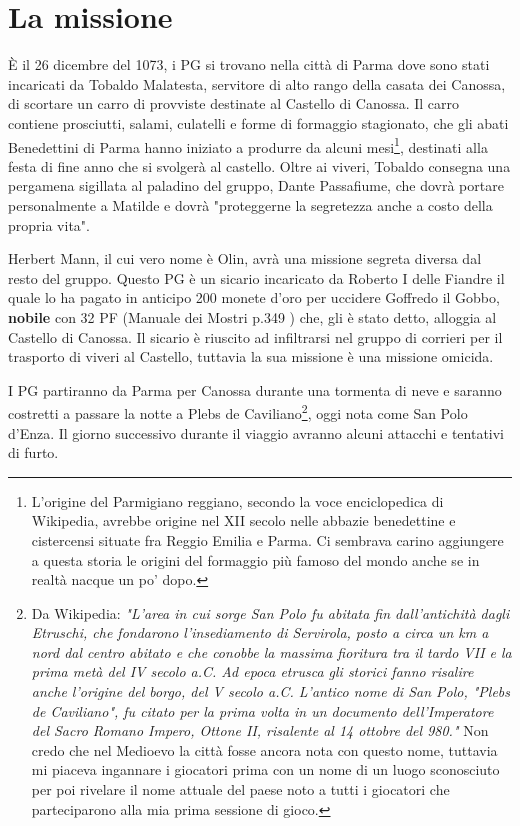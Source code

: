 \documentclass[letterpaper,twocolumn,openany,nodeprecatedcode]{dndbook}
\begin{document}
\section{La missione}
È il 26 dicembre del 1073, i PG si trovano nella città di Parma dove sono stati incaricati da Tobaldo Malatesta, servitore di alto rango della casata dei Canossa, di scortare un carro di provviste destinate al Castello di Canossa. Il carro contiene prosciutti, salami, culatelli e forme di formaggio stagionato, che gli abati Benedettini di Parma hanno iniziato a produrre da alcuni mesi\footnote{L'origine del Parmigiano reggiano, secondo la voce enciclopedica di Wikipedia, avrebbe origine nel XII secolo nelle abbazie benedettine e cistercensi situate fra Reggio Emilia e Parma. Ci sembrava carino aggiungere a questa storia le origini del formaggio più famoso del mondo anche se in realtà nacque un po' dopo.}, destinati alla festa di fine anno che si svolgerà al castello. Oltre ai viveri, Tobaldo consegna una pergamena sigillata al paladino del gruppo, Dante Passafiume, che dovrà portare personalmente a Matilde e dovrà "proteggerne la segretezza anche a costo della propria vita".

Herbert Mann, il cui vero nome è Olin, avrà una missione segreta diversa dal resto del gruppo. Questo PG è un sicario incaricato da Roberto I delle Fiandre il quale lo ha pagato in anticipo 200 monete d'oro per uccidere Goffredo il Gobbo, \textbf{nobile} con 32 PF (Manuale dei Mostri p.349 \cite{dnd:mostri}) che, gli è stato detto, alloggia al Castello di Canossa. Il sicario è riuscito ad infiltrarsi nel gruppo di corrieri per il trasporto di viveri al Castello, tuttavia la sua missione è una missione omicida.

I PG partiranno da Parma per Canossa durante una tormenta di neve e saranno costretti a passare la notte a Plebs de Caviliano\footnote{Da Wikipedia: \textit{"L'area in cui sorge San Polo fu abitata fin dall'antichità dagli Etruschi, che fondarono l'insediamento di Servirola, posto a circa un km a nord dal centro abitato e che conobbe la massima fioritura tra il tardo VII e la prima metà del IV secolo a.C. Ad epoca etrusca gli storici fanno risalire anche l'origine del borgo, del V secolo a.C. L'antico nome di San Polo, "Plebs de Caviliano", fu citato per la prima volta in un documento dell'Imperatore del Sacro Romano Impero, Ottone II, risalente al 14 ottobre del 980."} Non credo che nel Medioevo la città fosse ancora nota con questo nome, tuttavia mi piaceva ingannare i giocatori prima con un nome di un luogo sconosciuto per poi rivelare il nome attuale del paese noto a tutti i giocatori che parteciparono alla mia prima sessione di gioco.}, oggi nota come San Polo d'Enza. Il giorno successivo durante il viaggio avranno alcuni attacchi e tentativi di furto.
\end{document}

